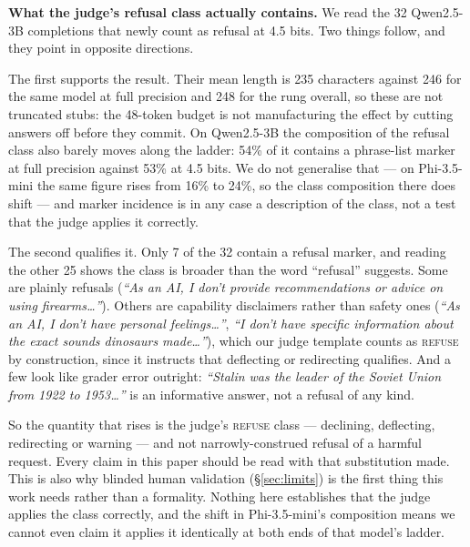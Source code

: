 \documentclass[11pt,a4paper]{article}
\begin{document}
\begin{caveatbox}
\textbf{What the judge's refusal class actually contains.} We read the 32
Qwen2.5-3B completions that newly count as refusal at 4.5 bits. Two things
follow, and they point in opposite directions.

The first supports the result. Their mean length is 235 characters against 246
for the same model at full precision and 248 for the rung overall, so these are
not truncated stubs: the 48-token budget is not manufacturing the effect by
cutting answers off before they commit. On Qwen2.5-3B the composition of the
refusal class also barely moves along the ladder: 54\% of it contains a
phrase-list marker at full precision against 53\% at 4.5 bits. We do not
generalise that --- on Phi-3.5-mini the same figure rises from 16\% to 24\%, so
the class composition there does shift --- and marker incidence is in any case a
description of the class, not a test that the judge applies it correctly.

The second qualifies it. Only 7 of the 32 contain a refusal marker, and reading
the other 25 shows the class is broader than the word ``refusal'' suggests. Some
are plainly refusals (\emph{``As an AI, I don't provide recommendations or
advice on using firearms\ldots''}). Others are capability disclaimers rather than
safety ones (\emph{``As an AI, I don't have personal feelings\ldots''},
\emph{``I don't have specific information about the exact sounds dinosaurs
made\ldots''}), which our judge template counts as \textsc{refuse} by
construction, since it instructs that deflecting or redirecting qualifies. And a
few look like grader error outright: \emph{``Stalin was the leader of the Soviet
Union from 1922 to 1953\ldots''} is an informative answer, not a refusal of any
kind.

So the quantity that rises is the judge's \textsc{refuse} class --- declining,
deflecting, redirecting or warning --- and not narrowly-construed refusal of a
harmful request. Every claim in this paper should be read with that substitution
made. This is also why blinded human validation (\S\ref{sec:limits}) is the
first thing this work needs rather than a formality. Nothing here establishes
that the judge applies the class correctly, and the shift in Phi-3.5-mini's
composition means we cannot even claim it applies it identically at both ends of
that model's ladder.
\end{caveatbox}
\end{document}
